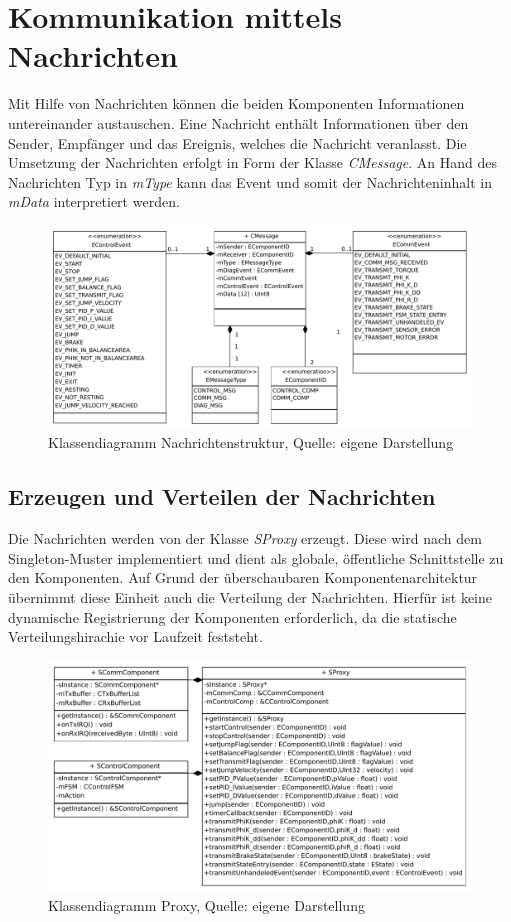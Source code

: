 \documentclass{article}
\begin{document}
\newpage
\section{Kommunikation mittels Nachrichten}
Mit Hilfe von Nachrichten können die beiden Komponenten Informationen untereinander austauschen. Eine Nachricht enthält Informationen über den Sender, Empfänger und das Ereignis, welches die Nachricht veranlasst. Die Umsetzung der Nachrichten erfolgt in Form der Klasse \textit{CMessage}. An Hand des Nachrichten Typ in \textit{mType} kann das Event und somit der Nachrichteninhalt in \textit{mData} interpretiert werden.

\begin{figure}[h]
	\includegraphics[width=\linewidth]{Nachrichtenstruktur}
	\caption{Klassendiagramm Nachrichtenstruktur, Quelle: eigene Darstellung}
\end{figure}

\subsection{Erzeugen und Verteilen der Nachrichten}
Die Nachrichten werden von der Klasse \textit{SProxy} erzeugt. Diese wird nach dem Singleton-Muster implementiert und dient als globale, öffentliche Schnittstelle zu den Komponenten. Auf Grund der überschaubaren Komponentenarchitektur übernimmt diese Einheit auch die Verteilung der Nachrichten. Hierfür ist keine dynamische Registrierung der Komponenten erforderlich, da die statische Verteilungshirachie vor Laufzeit feststeht.

\begin{figure}[h]
	\includegraphics[width=\linewidth]{Proxy}
	\caption{Klassendiagramm Proxy, Quelle: eigene Darstellung}
\end{figure}
\end{document}
